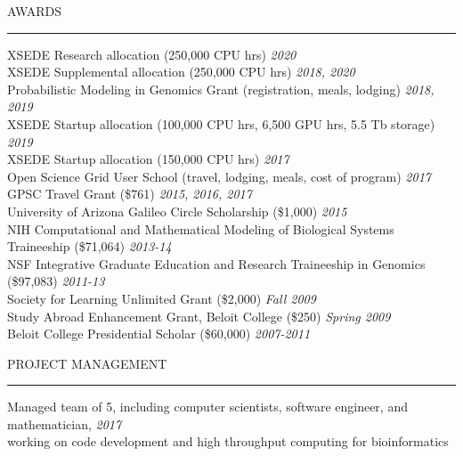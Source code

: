 \documentclass{resume} %
\renewenvironment{rSection}[1]{
\sectionskip
\textcolor{RoyalPurple}{\MakeUppercase{#1}}
\sectionlineskip
\hrule
\begin{list}{}{
\setlength{\leftmargin}{1.5em}
}
\item[]
}{
\end{list}
}
\begin{document}

\begin{rSection}{Awards}

XSEDE Research allocation (250,000 CPU hrs) \hfill{\em 2020}\\
XSEDE Supplemental allocation (250,000 CPU hrs) \hfill{\em 2018, 2020}\\
Probabilistic Modeling in Genomics Grant (registration, meals, lodging) \hfill{\em 2018, 2019}\\
XSEDE Startup allocation (100,000 CPU hrs, 6,500 GPU hrs, 5.5 Tb storage) \hfill{\em 2019}\\
XSEDE Startup allocation (150,000 CPU hrs) \hfill{\em 2017}\\
Open Science Grid User School (travel, lodging, meals, cost of program) \hfill{\em 2017}\\
GPSC Travel Grant (\$761) \hfill{\em 2015, 2016, 2017} \\
University of Arizona Galileo Circle Scholarship (\$1,000) \hfill{\em 2015} \\
NIH Computational and Mathematical Modeling of Biological Systems Traineeship (\$71,064) \hfill {\em 2013-14}\\
NSF Integrative Graduate Education and Research Traineeship in Genomics (\$97,083) \hfill {\em 2011-13}\\
Society for Learning Unlimited Grant (\$2,000) \hfill {\em Fall 2009}\\
Study Abroad Enhancement Grant, Beloit College (\$250) \hfill {\em Spring 2009}\\
Beloit College Presidential Scholar (\$60,000) \hfill {\em 2007-2011}

\end{rSection}


\begin{rSection}{Project Management}

Managed team of 5, including computer scientists, software engineer, and mathematician, \hfill {\em 2017}\\ 
working on code development and high throughput computing for bioinformatics

\end{rSection}
\end{document}
